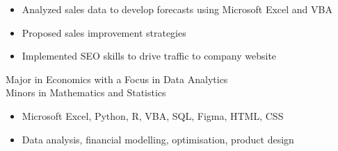 \documentclass[10pt,a4paper,ragged2e]{altacv}
\begin{document}
\divider

\begin{itemize}
    \item Analyzed sales data to develop forecasts using Microsoft Excel and VBA
    \item Proposed sales improvement strategies
    \item Implemented SEO skills to drive traffic to company website
\end{itemize}

Major in Economics with a Focus in Data Analytics \\ Minors in Mathematics and Statistics


\begin{itemize}
    \item Microsoft Excel, Python, R, VBA, SQL, Figma, HTML, CSS
    \item Data analysis, financial modelling, optimisation, product design
\end{itemize}

\clearpage
\nocite{*}
\end{document}
